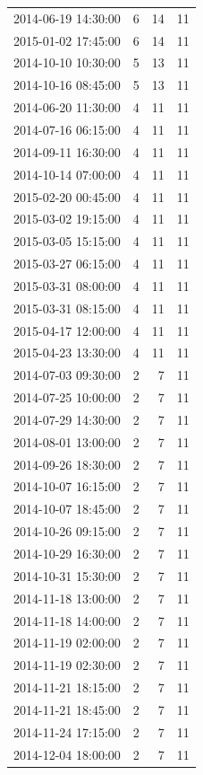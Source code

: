 \begin{tabular}{lrrr}
2014-06-19 14:30:00 & 6 & 14 & 11 \\
2015-01-02 17:45:00 & 6 & 14 & 11 \\
2014-10-10 10:30:00 & 5 & 13 & 11 \\
2014-10-16 08:45:00 & 5 & 13 & 11 \\
2014-06-20 11:30:00 & 4 & 11 & 11 \\
2014-07-16 06:15:00 & 4 & 11 & 11 \\
2014-09-11 16:30:00 & 4 & 11 & 11 \\
2014-10-14 07:00:00 & 4 & 11 & 11 \\
2015-02-20 00:45:00 & 4 & 11 & 11 \\
2015-03-02 19:15:00 & 4 & 11 & 11 \\
2015-03-05 15:15:00 & 4 & 11 & 11 \\
2015-03-27 06:15:00 & 4 & 11 & 11 \\
2015-03-31 08:00:00 & 4 & 11 & 11 \\
2015-03-31 08:15:00 & 4 & 11 & 11 \\
2015-04-17 12:00:00 & 4 & 11 & 11 \\
2015-04-23 13:30:00 & 4 & 11 & 11 \\
2014-07-03 09:30:00 & 2 & 7 & 11 \\
2014-07-25 10:00:00 & 2 & 7 & 11 \\
2014-07-29 14:30:00 & 2 & 7 & 11 \\
2014-08-01 13:00:00 & 2 & 7 & 11 \\
2014-09-26 18:30:00 & 2 & 7 & 11 \\
2014-10-07 16:15:00 & 2 & 7 & 11 \\
2014-10-07 18:45:00 & 2 & 7 & 11 \\
2014-10-26 09:15:00 & 2 & 7 & 11 \\
2014-10-29 16:30:00 & 2 & 7 & 11 \\
2014-10-31 15:30:00 & 2 & 7 & 11 \\
2014-11-18 13:00:00 & 2 & 7 & 11 \\
2014-11-18 14:00:00 & 2 & 7 & 11 \\
2014-11-19 02:00:00 & 2 & 7 & 11 \\
2014-11-19 02:30:00 & 2 & 7 & 11 \\
2014-11-21 18:15:00 & 2 & 7 & 11 \\
2014-11-21 18:45:00 & 2 & 7 & 11 \\
2014-11-24 17:15:00 & 2 & 7 & 11 \\
2014-12-04 18:00:00 & 2 & 7 & 11 \\

\end{tabular}
